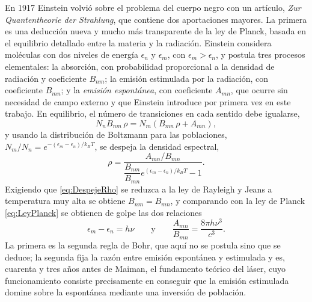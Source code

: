             En 1917 Einstein volvió sobre el problema del cuerpo negro con un artículo, \textit{Zur Quantentheorie der Strahlung}, que contiene dos aportaciones mayores. La primera es una deducción nueva y mucho más transparente de la ley de Planck, basada en el equilibrio detallado entre la materia y la radiación. Einstein considera moléculas con dos niveles de energía $\epsilon_{n}$ y $\epsilon_{m}$, con $\epsilon_{m}>\epsilon_{n}$, y postula tres procesos elementales: la absorción, con probabilidad proporcional a la densidad de radiación y coeficiente $B_{nm}$; la emisión estimulada por la radiación, con coeficiente $B_{mn}$; y la \textit{emisión espontánea}, con coeficiente $A_{mn}$, que ocurre sin necesidad de campo externo y que Einstein introduce por primera vez en este trabajo. En equilibrio, el número de transiciones en cada sentido debe igualarse,
            \begin{equation}\label{eq:BalanceDetallado}
                N_{n}B_{nm}\,\rho = N_{m}\left(B_{mn}\,\rho + A_{mn}\right),
            \end{equation}
            y usando la distribución de Boltzmann para las poblaciones, $N_{m}/N_{n} = e^{-(\epsilon_{m}-\epsilon_{n})/k_{B}T}$, se despeja la densidad espectral,
            \begin{equation}\label{eq:DespejeRho}
                \rho = \frac{A_{mn}/B_{mn}}{\dfrac{B_{nm}}{B_{mn}}e^{(\epsilon_{m}-\epsilon_{n})/k_{B}T} - 1} .
            \end{equation}
            Exigiendo que \eqref{eq:DespejeRho} se reduzca a la ley de Rayleigh y Jeans a temperatura muy alta se obtiene $B_{nm} = B_{mn}$, y comparando con la ley de Planck \eqref{eq:LeyPlanck} se obtienen de golpe las dos relaciones
            \begin{equation}\label{eq:RelacionesAB}
                \epsilon_{m}-\epsilon_{n} = h\nu
                \qquad\text{y}\qquad
                \frac{A_{mn}}{B_{mn}} = \frac{8\pi h\nu^{3}}{c^{3}} .
            \end{equation}
            La primera es la segunda regla de Bohr, que aquí no se postula sino que se deduce; la segunda fija la razón entre emisión espontánea y estimulada y es, cuarenta y tres años antes de Maiman, el fundamento teórico del láser, cuyo funcionamiento consiste precisamente en conseguir que la emisión estimulada domine sobre la espontánea mediante una inversión de población.

